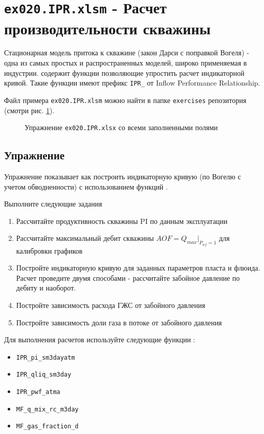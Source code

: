 \section{\texttt{ex020.IPR.xlsm} - Расчет производительности скважины}

Стационарная модель притока к скважине (закон Дарси с поправкой Вогеля) - одна из самых простых и распространенных моделей, широко применяемая в индустрии. \unf{} содержит функции позволяющие упростить расчет индикаторной кривой. Такие функции имеют префикс \texttt{IPR_} от Inflow Performance Relationship.

Файл примера \texttt{ex020.IPR.xlsm} можно найти в папке \texttt{exercises} репозитория \unf{} (смотри рис. \ref{ris:Ex20_1}).

\begin{figure}[h!]
	\center{\texttt{[image: Ex20\_1]}}
	\caption{Упражнение \texttt{ex020.IPR.xlsx} со всеми заполненными полями }
	\label{ris:Ex20_1}
\end{figure}


\subsection{Упражнение}
Упражнение показывает как построить индикаторную кривую (по Вогелю с учетом обводненности) с использованием функций \unf{}.
 

Выполните следующие задания
\begin{enumerate}
	\item  Рассчитайте продуктивность скважины PI по данным эксплуатации
	\item  Рассчитайте максимальный дебит скважины $AOF=Q_{max}|_{P_{wf}=1}$ для калибровки графиков
	 	 
	\item  Постройте индикаторную кривую для заданных параметров пласта и флюида. Расчет проведите двумя способами - рассчитайте забойное давление по дебиту и наоборот.
	\item  Постройте зависимость расхода ГЖС от забойного давления 
	\item  Постройте зависимость доли газа в потоке от забойного давления
\end{enumerate}


Для выполнения расчетов используйте следующие функции \unf{}:
\begin{itemize}
	
	\item \texttt{IPR\_pi\_sm3dayatm	}
	\item \texttt{IPR\_qliq\_sm3day}
	\item \texttt{IPR\_pwf\_atma}
	\item \texttt{MF\_q\_mix\_rc\_m3day}
	\item \texttt{MF\_gas\_fraction\_d}
	
\end{itemize}


